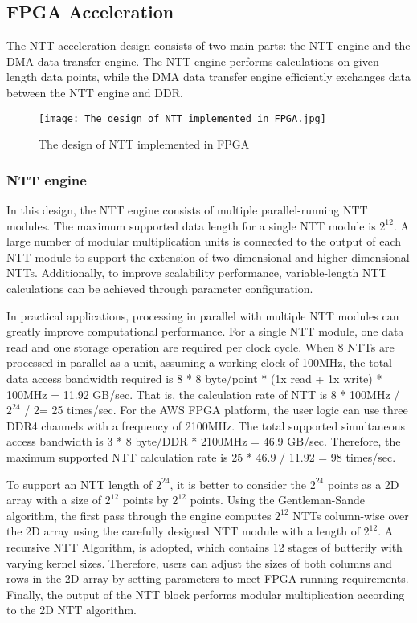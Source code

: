 \subsection{FPGA Acceleration}\label{section: fpga-acceleration}

The NTT acceleration design consists of two main parts: the NTT engine and the DMA data transfer engine. The NTT engine performs calculations on given-length data points, while the DMA data transfer engine efficiently exchanges data between the NTT engine and DDR.

\begin{figure}[ht]
  \centering
  \texttt{[image: The design of NTT implemented in FPGA.jpg]}
  \caption{The design of NTT implemented in FPGA}
  \label{fig:The design of NTT implemented in FPGA}
\end{figure}

\subsubsection{NTT engine}

In this design, the NTT engine consists of multiple parallel-running NTT modules. The maximum supported data length for a single NTT module is $2^{12}$. A large number of modular multiplication units is connected to the output of each NTT module to support the extension of two-dimensional and higher-dimensional NTTs. Additionally, to improve scalability performance, variable-length NTT calculations can be achieved through parameter configuration.

In practical applications, processing in parallel with multiple NTT modules can greatly improve computational performance. For a single NTT module, one data read and one storage operation are required per clock cycle. When 8 NTTs are processed in parallel as a unit, assuming a working clock of 100MHz, the total data access bandwidth required is 8 * 8 byte/point * (1x read + 1x write) * 100MHz = 11.92 GB/sec. That is, the calculation rate of NTT is 8 * 100MHz / $2^{24}$ / 2= 25 times/sec. For the AWS FPGA platform, the user logic can use three DDR4 channels with a frequency of 2100MHz. The total supported simultaneous access bandwidth is 3 * 8 byte/DDR * 2100MHz = 46.9 GB/sec. Therefore, the maximum supported NTT calculation rate is 25 * 46.9 / 11.92 = 98 times/sec.



To support an NTT length of $2^{24}$, it is better to consider the $2^{24}$ points as a 2D array with a size of $2^{12}$ points by $2^{12}$ points. Using the Gentleman-Sande algorithm, the first pass through the engine computes $2^{12}$ NTTs column-wise over the 2D array using the carefully designed NTT module with a length of $2^{12}$. A recursive NTT Algorithm, is adopted, which contains 12 stages of butterfly with varying kernel sizes. Therefore, users can adjust the sizes of both columns and rows in the 2D array by setting parameters to meet FPGA running requirements. Finally, the output of the NTT block performs modular multiplication according to the 2D NTT algorithm.

